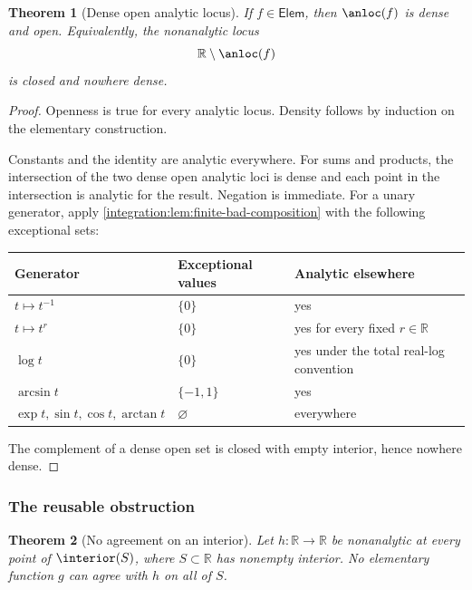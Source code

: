 \documentclass[11pt,oneside]{article}
\newtheorem{theorem}{Theorem}[section]
\theoremstyle{definition}
\theoremstyle{remark}
\newcommand{\R}{\mathbb R}
\begin{document}
\begin{theorem}[Dense open analytic locus]
\label{integration:thm:elementary-dense-analytic}
If $f\in\mathsf{Elem}$, then $\anloc(f)$ is dense and open.  Equivalently, the nonanalytic
locus
\begin{equation}
 \R\setminus\anloc(f)
 \label{integration:eq:elementary-exceptional-set}
\end{equation}
is closed and nowhere dense.
\end{theorem}

\begin{proof}
Openness is true for every analytic locus.  Density follows by induction on the elementary
construction.

Constants and the identity are analytic everywhere.  For sums and products, the
intersection of the two dense open analytic loci is dense and each point in the intersection
is analytic for the result.  Negation is immediate.  For a unary generator, apply
\cref{integration:lem:finite-bad-composition} with the following exceptional sets:
\begin{center}
\begin{tabular}{@{}lll@{}}
\toprule
Generator & Exceptional values & Analytic elsewhere\\
\midrule
$t\mapsto t^{-1}$ & $\{0\}$ & yes\\
$t\mapsto t^r$ & $\{0\}$ & yes for every fixed $r\in\R$\\
$\log t$ & $\{0\}$ & yes under the total real-log convention\\
$\arcsin t$ & $\{-1,1\}$ & yes\\
$\exp t,\sin t,\cos t,\arctan t$ & $\varnothing$ & everywhere\\
\bottomrule
\end{tabular}
\end{center}
The complement of a dense open set is closed with empty interior, hence nowhere dense.
\end{proof}

\subsubsection{The reusable obstruction}

\begin{theorem}[No agreement on an interior]
\label{integration:thm:elementary-obstruction}
Let $h:\R\to\R$ be nonanalytic at every point of $\interior(S)$, where
$S\subset\R$ has nonempty interior.  No elementary function $g$ can agree with $h$ on all of
$S$.
\end{theorem}
\end{document}
